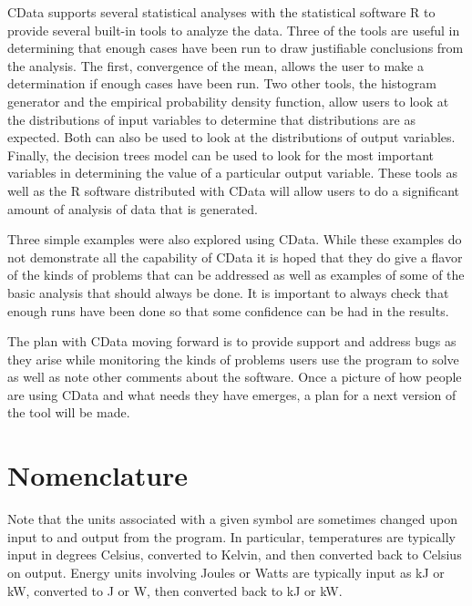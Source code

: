 \documentclass[12pt,twoside]{book}
\begin{document}
CData supports several statistical analyses with the statistical software R to provide several built-in tools to analyze the data. Three of the tools are useful in determining that enough cases have been run to draw justifiable conclusions from the analysis. The first, convergence of the mean, allows the user to make a determination if enough cases have been run. Two other tools, the histogram generator and the empirical probability density function, allow users to look at the distributions of input variables to determine that distributions are as expected. Both can also be used to look at the distributions of output variables. Finally, the decision trees model can be used to look for the most important variables in determining the value of a particular output variable. These tools as well as the R software distributed with CData will allow users to do a significant amount of analysis of data that is generated.

Three simple examples were also explored using CData. While these examples do not demonstrate all the capability of CData it is hoped that they do give a flavor of the kinds of problems that can be addressed as well as examples of some of the basic analysis that should always be done. It is important to always check that enough runs have been done so that some confidence can be had in the results.

The plan with CData moving forward is to provide support and address bugs as they arise while monitoring the kinds of problems users use the program to solve as well as note other comments about the software. Once a picture of how people are using CData and what needs they have emerges, a plan for a next version of the tool will be made.





\appendix
{}

%
%

\chapter{Nomenclature}
\label{nomenclature}

Note that the units associated with a given symbol are sometimes changed upon input to and output from the program. In particular, temperatures are typically input in degrees Celsius, converted to Kelvin, and then converted back to Celsius on output. Energy units involving Joules or Watts are typically input as kJ or kW, converted to J or W, then converted back to kJ or kW.
\end{document}
